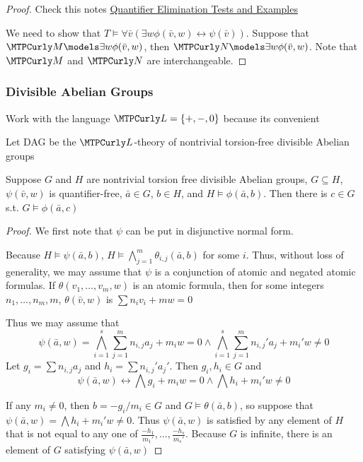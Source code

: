 \documentclass[11pt]{article}
\begin{document}
\begin{proof}
Check this notes \href{http://www.math.uni-konstanz.de/\~eleftheriou/teaching/Masterarbeit.pdf}{Quantifier Elimination Tests and Examples}

We need to show that \(T\models\forall\bar{v}(\exists w\phi(\bar{v},w)\leftrightarrow\psi(\bar{v}))\).
Suppose that \(\calm\models\exists w\phi(\bar{v},w)\), then
\(\caln\models\exists w\phi(\bar{v},w)\). Note that \(\calm\) and \(\caln\) are interchangeable.
\end{proof}

\subsubsection{Divisible Abelian Groups}
\label{sec:org41b73f5}
Work with the language \(\call=\{+,-,0\}\) because its convenient

Let DAG be the \(\call\)-theory of nontrivial torsion-free divisible Abelian
groups

\begin{lemma}[]
\label{lemma3.1.7}
Suppose \(G\) and \(H\) are nontrivial torsion free divisible Abelian
groups, \(G\subseteq H\), \(\psi(\bar{v},w)\) is quantifier-free,
\(\bar{a}\in G\), \(b\in H\), and \(H\models\phi(\bar{a},b)\). Then there is
\(c\in G\) s.t. \(G\models\phi(\bar{a},c)\)
\end{lemma}

\begin{proof}
We first note that \(\psi\) can be put in disjunctive normal form.

Because \(H\models\psi(\bar{a},b)\),
\(H\models\bigwedge_{j=1}^m\theta_{i,j}(\bar{a},b)\) for some \(i\). Thus, without
loss of generality, we may assume that \(\psi\) is a conjunction of atomic and
negated atomic formulas. If \(\theta(v_1,\dots,v_m,w)\) is an atomic formula,
then for some integers \(n_1,\dots,n_m,m\), \(\theta(\bar{v},w)\) is
\(\sum n_iv_i+mw=0\)

Thus we may assume that
\begin{equation*}
\psi(\bar{a},w)=\displaystyle\bigwedge_{i=1}^s\sum_{j=1}^mn_{i,j}a_j+m_iw=0\wedge
\bigwedge_{i=1}^s\sum_{j=1}^mn_{i,j}'a_j+m_i'w\neq0
\end{equation*}
Let \(g_i=\sum n_{i,j}a_j\) and \(h_i=\sum n_{i,j}'a_j'\). Then \(g_i,h_i\in G\) and
\begin{equation*}
\psi(\bar{a},w)\leftrightarrow\bigwedge g_i+m_iw=0\wedge\bigwedge h_i+m_i'w\neq0
\end{equation*}

If any \(m_i\neq0\), then \(b=-g_i/m_i\in G\) and \(G\models\theta(\bar{a},b)\),
so suppose that \(\psi(\bar{a},w)=\bigwedge h_i+m_i'w\neq0\). Thus
\(\psi(\bar{a},w)\) is satisfied by any element of \(H\) that is not equal to
any one of \(\frac{-h_1}{m_1'},\dots,\frac{-h_s}{m_s'}\). Because \(G\) is
infinite, there is an element  of \(G\) satisfying \(\psi(\bar{a},w)\)
\end{proof}
\end{document}
